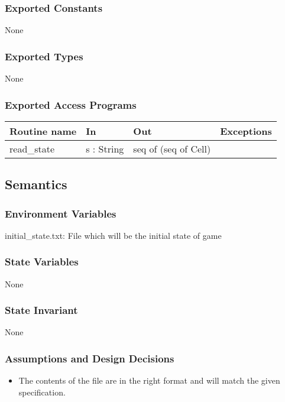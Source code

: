 \documentclass[12pt]{article}
\begin{document}
\subsubsection* {Exported Constants}

None

\subsubsection* {Exported Types}

None

\subsubsection* {Exported Access Programs}

\begin{tabular}{| l | l | l | p{5cm} |}
\hline
\textbf{Routine name} & \textbf{In} & \textbf{Out} & \textbf{Exceptions}\\
\hline
read\_state & s : String & seq of (seq of Cell) & \\
\hline
\end{tabular}

\subsection* {Semantics}

\subsubsection* {Environment Variables}

initial\_state.txt: File which will be the initial state of game

\subsubsection* {State Variables}

None

\subsubsection* {State Invariant}

None

\subsubsection* {Assumptions and Design Decisions}

\begin{itemize}
    \item The contents of the file are in the right format and will match the given specification.
\end{itemize}
\end{document}
